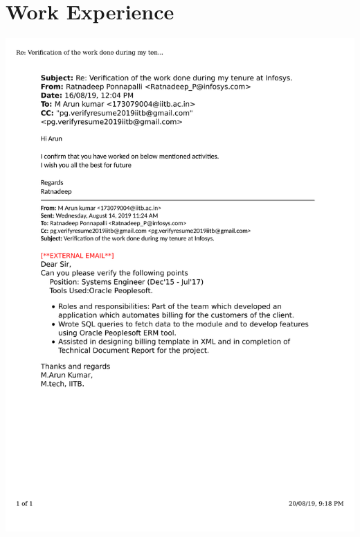 \documentclass{article}
\begin{document}
\section{Work Experience}
	\includegraphics[page=1, scale=0.5]{proofs/workex.pdf}\\
\end{document}
